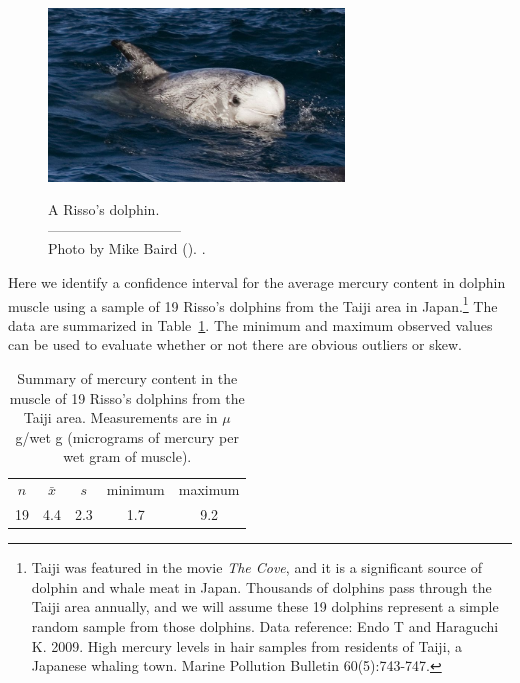 \begin{figure}[h]
\centering
\includegraphics[width=0.7\textwidth]{ch_inference_for_means/figures/rissosDolphin/rissosDolphin.jpg}  \\
\addvspace{2mm}
\begin{minipage}{\textwidth}
   \caption[rissosDolphinPic]{A Risso's dolphin.\vspace{-1mm} \\
   -----------------------------\vspace{-2mm}\\
   {\footnotesize Photo by Mike Baird (). .\vspace{-10mm}}}
   \label{rissosDolphin}
\end{minipage}
\vspace{3mm}
\end{figure}
\setlength{\captionwidth}{\mycaptionwidth}

Here we identify a confidence interval for the average mercury content in dolphin muscle using a sample of 19 Risso's dolphins from the Taiji area in Japan.\footnote{Taiji was featured in the movie \emph{The Cove}, and it is a significant source of dolphin and whale meat in Japan. Thousands of dolphins pass through the Taiji area annually, and we will assume these 19 dolphins represent a simple random sample from those dolphins. Data reference: Endo T and Haraguchi K. 2009. High mercury levels in hair samples from residents of Taiji, a Japanese whaling town. Marine Pollution Bulletin 60(5):743-747.} The data are summarized in Table~\ref{summaryStatsOfHgInMuscleOfRissosDolphins}. The minimum and maximum observed values can be used to evaluate whether or not there are obvious outliers or skew.

\begin{table}[h]
\centering
\begin{tabular}{ccc cc}
\hline
$n$ & $\bar{x}$ & $s$ & minimum & maximum \\
19   & 4.4	  & 2.3  & 1.7	       & 9.2 \\
\hline
\end{tabular}
\caption{Summary of mercury content in the muscle of 19 Risso's dolphins from the Taiji area. Measurements are in $\mu$g/wet g (micrograms of mercury per wet gram of muscle).}
\label{summaryStatsOfHgInMuscleOfRissosDolphins}
\end{table}

